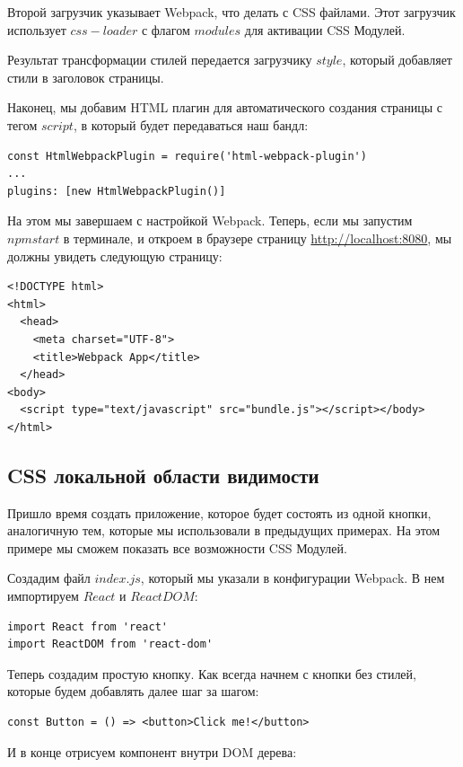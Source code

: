  Второй загрузчик указывает Webpack, что делать с CSS файлами. Этот загрузчик использует $css-loader$ с флагом $modules$ для активации CSS Модулей.
 
 Результат трансформации стилей передается загрузчику $style$, который добавляет стили в заголовок страницы.
 
 Наконец, мы добавим HTML плагин для автоматического создания страницы с тегом $script$, в который будет передаваться наш бандл:
 
\begin{lstlisting}
const HtmlWebpackPlugin = require('html-webpack-plugin')
...
plugins: [new HtmlWebpackPlugin()]
\end{lstlisting}

На этом мы завершаем с настройкой Webpack. Теперь, если мы запустим $npm start$ в терминале, и откроем в браузере страницу \url{http://localhost:8080}, мы должны увидеть следующую страницу:

\begin{lstlisting}
<!DOCTYPE html>
<html>
  <head>
    <meta charset="UTF-8">
    <title>Webpack App</title>
  </head>
<body>
  <script type="text/javascript" src="bundle.js"></script></body>
</html>
\end{lstlisting}
 
\subsection{CSS локальной области видимости}

Пришло время создать приложение, которое будет состоять из одной кнопки, аналогичную тем, которые мы использовали в предыдущих примерах. На этом примере мы сможем показать все возможности CSS Модулей.

Создадим файл $index.js$, который мы указали в конфигурации Webpack. В нем импортируем $React$ и $ReactDOM$:

\begin{lstlisting}
import React from 'react'
import ReactDOM from 'react-dom'
\end{lstlisting}

Теперь создадим простую кнопку. Как всегда начнем с кнопки без стилей, которые будем добавлять далее шаг за шагом:

\begin{lstlisting}
const Button = () => <button>Click me!</button>
\end{lstlisting}

И в конце отрисуем компонент внутри DOM дерева:

